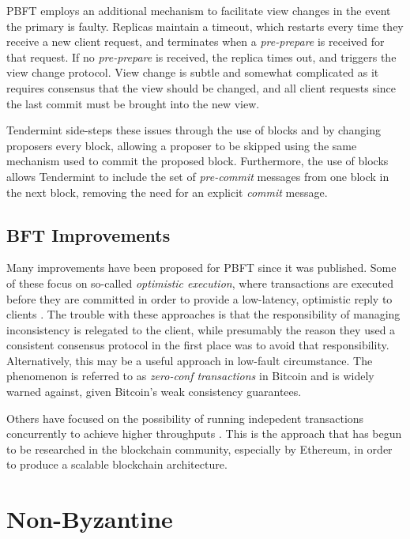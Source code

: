 PBFT employs an additional mechanism to facilitate view changes in the event the primary is faulty.
Replicas maintain a timeout, which restarts every time they receive a new client request, 
and terminates when a \emph{pre-prepare} is received for that request.
If no \emph{pre-prepare} is received, the replica  times out, and triggers the view change protocol.
View change is subtle and somewhat complicated as it requires consensus that the view should be changed, 
and all client requests since the last commit must be brought into the new view.

Tendermint side-steps these issues through the use of blocks and by changing proposers every block,
allowing a proposer to be skipped using the same mechanism used to commit the proposed block.
Furthermore, the use of blocks allows Tendermint to include the set of \emph{pre-commit} 
messages from one block in the next block, removing the need for an explicit \emph{commit} message.

\subsection{BFT Improvements} 

Many improvements have been proposed for PBFT since it was published.
Some of these focus on so-called \emph{optimistic execution}, 
where transactions are executed before they are committed in order to provide a low-latency,
optimistic reply to clients \cite{kotla2007zyzzyva,garcia2011efficient}.
The trouble with these approaches is that the responsibility of managing inconsistency is relegated to the client,
while presumably the reason they used a consistent consensus protocol in the first place was to avoid that responsibility.
Alternatively, this may be a useful approach in low-fault circumstance.
The phenomenon is referred to as \emph{zero-conf transactions} in Bitcoin and is widely warned against,
given Bitcoin's weak consistency guarantees.

Others have focused on the possibility of running indepedent transactions concurrently to achieve higher throughputs \cite{kotla2004high}.
This is the approach that has begun to be researched in the blockchain community, especially by Ethereum, in order to produce a scalable blockchain architecture.

\section{Non-Byzantine}

